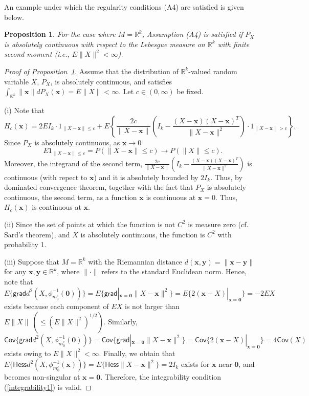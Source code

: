 \documentclass[preprint]{imsart}
\newcommand{\bbR}{\mathbb{R}}
\def\xv{\mathbf x}
\theoremstyle{plain}
\newtheorem{proposition}{Proposition}
\theoremstyle{remark}
\begin{document}
\begin{appendix}
 An example under which the regularity conditions (A4) are satisfied is given below. 
 
 \begin{proposition}\label{example:regularity}
     For the case where $M = \mathbb{R}^k$, Assumption (A4) is satisfied if $P_X$ is absolutely continuous with respect to the Lebesgue measure on $\bbR^{k}$ with finite second moment (i.e., $E\| X \|^2 < \infty$). 
 \end{proposition} 

%
\begin{proof}[Proof of Proposition~\ref{example:regularity}]
    
Assume that the distribution of $\bbR^k$-valued random variable $X$, $P_X$, is absolutely continuous, and satisfies $\int_{\bbR^{k}} \|\mathbf{x}\| dP_{X}(\mathbf{x}) = E\|X\| < \infty$. Let $c \in (0,\infty)$ be fixed. 

(i) Note that $$H_c(\xv) = 2 E I_{k} \cdot 1_{\|X -\xv\| \le c} + E \left\{ \frac{2c}{\|X -\xv\|} \left( I_k -  \frac{(X -\xv ) (X -\xv )^T}{\|X -\xv\|^2} \right) \cdot 1_{\|X -\xv\| > c}
\right\}.$$ Since $P_X$ is absolutely continuous, as $\xv \to 0$
$$ 
E 1_{\|X -\xv\| \le c} = P(\|X -\xv\| \le c) \to  P(\|X\| \le c).
$$
Moreover, the integrand of the second term, $\frac{2c}{\|X -\xv\|} \left( I_k -  \frac{(X -\xv ) (X -\xv )^T}{\|X -\xv\|^2} \right)$ is continuous (with repect to $\xv$) and it is absolutely bounded by $2I_k$. Thus, by dominated convergence theorem, together with the fact that $P_X$ is absolutely continuous, the second term, as a function $\xv$ is continuous at $\xv = 0$. Thus, $H_c(\xv)$ is continuous at $\xv$.

(ii) Since the set of points at which the function is not $C^2$ is measure zero (cf. Sard's theorem), and $X$ is absolutely continuous, the function is $C^2$ with probability 1. 

(iii) Suppose that $M=\bbR^{k}$ with the Riemannian distance $d(\mathbf{x}, \mathbf{y}) = \|\mathbf{x}-\mathbf{y}\|$ for any $\mathbf{x}, \mathbf{y} \in \mathbb{R}^{k}$, where $\|\cdot\|$ refers to the standard Euclidean norm. Hence, note that $E\{\textsf{grad} d^2(X, \phi^{-1}_{m^{c}_{0}}(\mathbf{0})) \} = E\{\textsf{grad}|_{\mathbf{x}=\mathbf{0}} \|X - \mathbf{x} \|^2\} = E \{2(\mathbf{x} - X)|_{\mathbf{x} = \mathbf{0}}\} = -2EX$ exists because each component of $EX$ is not larger than $E\|X\| ~(\le (E\|X\|^2)^{1/2})$. Similarly, $\textsf{Cov}\{\textsf{grad} d^2(X, \phi^{-1}_{m^{c}_0}(\mathbf{0})) \} = \textsf{Cov}\{\textsf{grad}|_{\mathbf{x}= \mathbf{0}} \|X - \mathbf{x}\|^2\} = \textsf{Cov}\{2(\mathbf{x} - X)|_{\mathbf{x} = \mathbf{0}}\} = 4\textsf{Cov}(X)$ exists owing to $E\|X\|^2 < \infty$. Finally, we obtain that $E\{\textsf{Hess} d^2(X, \phi^{-1}_{m^{c}_0}(\mathbf{x})) \} = E\{\textsf{Hess} \|X - \mathbf{x} \|^2 \} = 2I_{k}$ exists for $\mathbf{x}$ near $\mathbf{0}$, and becomes non-singular at $\mathbf{x}=\mathbf{0}$. Therefore, the integrability condition (\ref{integrability1}) is valid. 


\end{proof}
\end{appendix}
\end{document}
